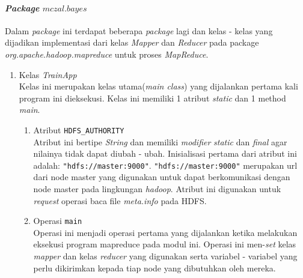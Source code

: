 \paragraph{\textit{Package} $mczal.bayes$}
Dalam \textit{package} ini terdapat beberapa \textit{package} lagi dan kelas - kelas yang dijadikan implementasi dari kelas \textit{Mapper} dan \textit{Reducer} pada package \textit{org.apache.hadoop.mapreduce} untuk proses \textit{MapReduce}.
\begin{enumerate}
	\item{Kelas \textit{TrainApp}}\\
	Kelas ini merupakan kelas utama(\textit{main class}) yang dijalankan pertama kali program ini dieksekusi. Kelas ini memiliki 1 atribut \textit{static} dan 1 method \textit{main}.
	\begin{enumerate}
		\item Atribut \verb|HDFS_AUTHORITY| \\
		Atribut ini bertipe \textit{String} dan memiliki \textit{modifier} \textit{static} dan \textit{final} agar nilainya tidak dapat diubah - ubah. Inisialisasi pertama dari atribut ini adalah: \verb|"hdfs://master:9000"|. \verb|"hdfs://master:9000"| merupakan url dari node master yang digunakan untuk dapat berkomunikasi dengan node master pada lingkungan \textit{hadoop}. Atribut ini digunakan untuk \textit{request} operasi baca file \textit{meta.info} pada HDFS.
		
		\item Operasi \verb|main|\\
		Operasi ini menjadi operasi pertama yang dijalankan ketika melakukan eksekusi program mapreduce pada modul ini. Operasi ini men-\textit{set} kelas \textit{mapper} dan kelas \textit{reducer} yang digunakan serta variabel - variabel yang perlu dikirimkan kepada tiap node yang dibutuhkan oleh mereka.
	\end{enumerate}


\end{enumerate}
